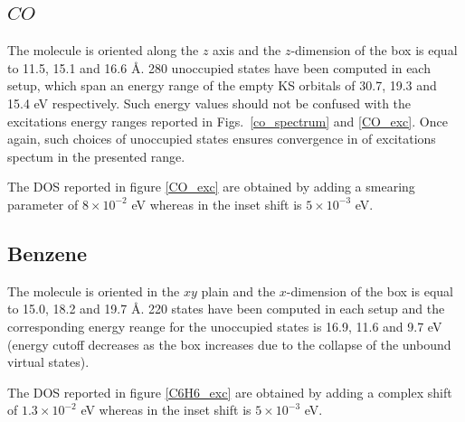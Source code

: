 \documentclass[reprint,aps,prb]{revtex4-1}
\begin{document}
\subsection{$CO$}
The molecule is oriented along the $z$ axis and the $z$-dimension of the box is equal to 11.5, 15.1 and 16.6 \AA.
280 unoccupied states have been computed in each setup, which span an energy range of the empty KS orbitals of 30.7, 19.3 and 15.4 eV respectively. 
Such energy values should not be confused with the excitations energy ranges reported in Figs.~\ref{co_spectrum} and \ref{CO_exc}. 
Once again, such choices of unoccupied states ensures convergence in of excitations spectum in the presented range.

The DOS reported in figure \ref{CO_exc} are obtained by adding a smearing parameter of $8\times 10^{-2}$ eV whereas in the inset shift is $5\times 10^{-3}$ eV. 

\subsection{Benzene}

The molecule is oriented in the $xy$ plain and the $x$-dimension of the box is equal to 15.0, 18.2 and 19.7 \AA.
220 states have been computed in each setup and the corresponding
energy reange for the unoccupied states is 16.9, 11.6 and 9.7 eV (energy cutoff decreases as the box increases due to the collapse of the unbound virtual states).  

The DOS reported in figure \ref{C6H6_exc} are obtained by adding a complex shift of $1.3\times 10^{-2}$ eV whereas in the inset shift is $5\times 10^{-3}$ eV. 



%

\end{document}
